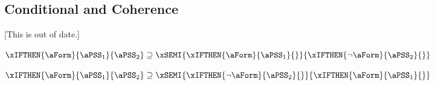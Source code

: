 \subsection{Conditional and Coherence}
\label{sec:if:seq}

[This is out of date.]

\begin{lemma}
  \label{lem:if:seq}
  \begin{math}
    \xIFTHEN{\aForm}{\aPSS_1}{\aPSS_2}
    \supseteq
    \xSEMI{
      \xIFTHEN{\aForm}{\aPSS_1}{}
    }{
      \xIFTHEN{\lnot\aForm}{\aPSS_2}{}
    }
  \end{math}

  \begin{math}
    \xIFTHEN{\aForm}{\aPSS_1}{\aPSS_2}
    \supseteq
    \xSEMI{
      \xIFTHEN{\lnot\aForm}{\aPSS_2}{}
    }{
      \xIFTHEN{\aForm}{\aPSS_1}{}
    }
  \end{math}
\end{lemma}


